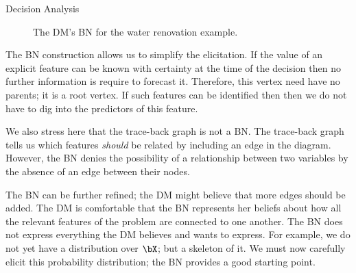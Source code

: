 \begin{chapter}{Decision Analysis \label{Ch:decision}}
\begin{figure}[H]
	\caption{The DM's BN for the water renovation example.}
	\label{Fig:provis-BN}
\end{figure}

The BN construction allows us to simplify the elicitation. If the value of an explicit feature can be known with certainty at the time of the decision then no further information is require to forecast it. Therefore, this vertex need have no parents; it is a root vertex. If such features can be identified then then we do not have to dig into the predictors of this feature.

We also stress here that the trace-back graph is not a BN. The trace-back graph tells us which features \textit{should} be related by including an edge in the diagram. However, the BN denies the possibility of a relationship between two variables by the absence of an edge between their nodes.

The BN can be further refined; the DM might believe that more edges should be added. The DM is  comfortable that the BN represents her beliefs about how all the relevant features of the problem are connected to one another. The BN does not express everything the DM believes and wants to express. For example, we do not yet have a distribution over $\bX$; but a skeleton of it. We must now carefully elicit this probability distribution; the BN provides a good starting point.


\end{chapter}
